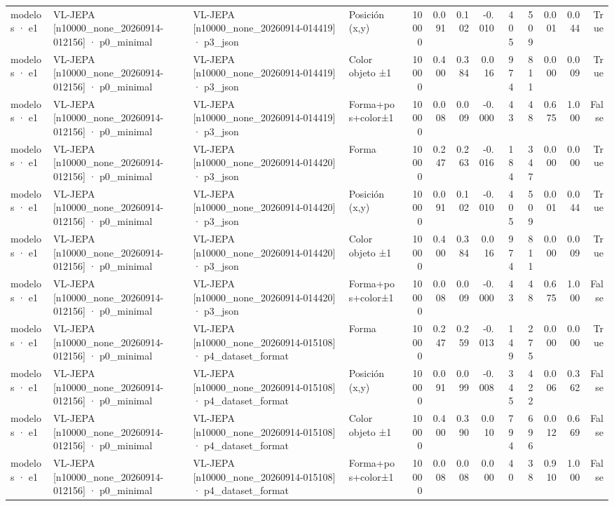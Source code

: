 \begin{tabular}{llllrrrrrrrrr}
modelos · e1 & VL-JEPA [n10000\_none\_20260914-012156] · p0\_minimal & VL-JEPA [n10000\_none\_20260914-014419] · p3\_json & Posición (x,y) & 10000 & 0.091 & 0.102 & -0.010 & 405 & 509 & 0.001 & 0.044 & True \\
modelos · e1 & VL-JEPA [n10000\_none\_20260914-012156] · p0\_minimal & VL-JEPA [n10000\_none\_20260914-014419] · p3\_json & Color objeto ±1 & 10000 & 0.400 & 0.384 & 0.016 & 974 & 811 & 0.000 & 0.009 & True \\
modelos · e1 & VL-JEPA [n10000\_none\_20260914-012156] · p0\_minimal & VL-JEPA [n10000\_none\_20260914-014419] · p3\_json & Forma+pos+color±1 & 10000 & 0.008 & 0.009 & -0.000 & 43 & 48 & 0.675 & 1.000 & False \\
modelos · e1 & VL-JEPA [n10000\_none\_20260914-012156] · p0\_minimal & VL-JEPA [n10000\_none\_20260914-014420] · p3\_json & Forma & 10000 & 0.247 & 0.263 & -0.016 & 184 & 347 & 0.000 & 0.000 & True \\
modelos · e1 & VL-JEPA [n10000\_none\_20260914-012156] · p0\_minimal & VL-JEPA [n10000\_none\_20260914-014420] · p3\_json & Posición (x,y) & 10000 & 0.091 & 0.102 & -0.010 & 405 & 509 & 0.001 & 0.044 & True \\
modelos · e1 & VL-JEPA [n10000\_none\_20260914-012156] · p0\_minimal & VL-JEPA [n10000\_none\_20260914-014420] · p3\_json & Color objeto ±1 & 10000 & 0.400 & 0.384 & 0.016 & 974 & 811 & 0.000 & 0.009 & True \\
modelos · e1 & VL-JEPA [n10000\_none\_20260914-012156] · p0\_minimal & VL-JEPA [n10000\_none\_20260914-014420] · p3\_json & Forma+pos+color±1 & 10000 & 0.008 & 0.009 & -0.000 & 43 & 48 & 0.675 & 1.000 & False \\
modelos · e1 & VL-JEPA [n10000\_none\_20260914-012156] · p0\_minimal & VL-JEPA [n10000\_none\_20260914-015108] · p4\_dataset\_format & Forma & 10000 & 0.247 & 0.259 & -0.013 & 149 & 275 & 0.000 & 0.000 & True \\
modelos · e1 & VL-JEPA [n10000\_none\_20260914-012156] · p0\_minimal & VL-JEPA [n10000\_none\_20260914-015108] · p4\_dataset\_format & Posición (x,y) & 10000 & 0.091 & 0.099 & -0.008 & 345 & 422 & 0.006 & 0.362 & False \\
modelos · e1 & VL-JEPA [n10000\_none\_20260914-012156] · p0\_minimal & VL-JEPA [n10000\_none\_20260914-015108] · p4\_dataset\_format & Color objeto ±1 & 10000 & 0.400 & 0.390 & 0.010 & 794 & 696 & 0.012 & 0.669 & False \\
modelos · e1 & VL-JEPA [n10000\_none\_20260914-012156] · p0\_minimal & VL-JEPA [n10000\_none\_20260914-015108] · p4\_dataset\_format & Forma+pos+color±1 & 10000 & 0.008 & 0.008 & 0.000 & 40 & 38 & 0.910 & 1.000 & False \\

\end{tabular}
